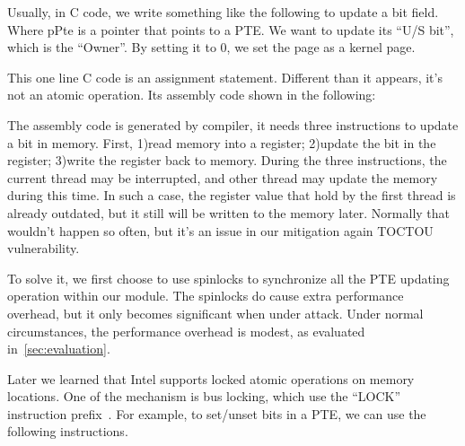 Usually, in C code, we write something like the following to update a bit field. Where pPte is a pointer that points to a PTE. We want to update its ``U/S bit'', which is the ``Owner''. By setting it to 0, we set the page as a kernel page. 


This one line C code is an assignment statement. Different than it appears, it's not an atomic operation. Its assembly code shown in the following:



The assembly code is generated by compiler, it needs three instructions to update a bit in memory. First, 1)read memory into a register; 2)update the bit in the register; 3)write the register back to memory. During the three instructions, the current thread may be interrupted, and other thread may update the memory during this time. In such a case, the register value that hold by the first thread is already outdated, but it still will be written to the memory later. Normally that wouldn't happen so often, but it's an issue in our mitigation again TOCTOU vulnerability.

To solve it, we first choose to use spinlocks to synchronize all the PTE updating operation within our module. The spinlocks do cause extra performance overhead, but it only becomes significant when under attack. Under normal circumstances, the performance overhead is modest, as evaluated in~\autoref{sec:evaluation}.  

Later we learned that Intel supports locked atomic operations on memory locations. One of the mechanism is bus locking, which use the ``LOCK'' instruction prefix~\cite{intelmanualchapter8}. For example, to set/unset bits in a PTE, we can use the following instructions.


